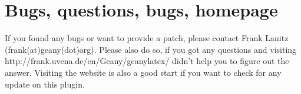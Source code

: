 \documentclass[/%
a4paper,%
10pt,%
oneside,%
DIV18,
headsepline,         %
plainheadsepline,
footsepline,         %
plainfootsepline,
bibtotoc,%
liststotoc,%
BCOR12mm,%
halfparskip,%
openany,%
]{scrartcl}
\begin{document}
\section{Bugs, questions, bugs, homepage}
\label{contact}
If you found any bugs or want to provide a patch, please contact Frank
Lanitz (frank(at)geany(dot)org). Please also do so, if you got any
questions and visiting http://frank.uvena.de/en/Geany/geanylatex/
didn't help you to figure out the answer. Visiting the website is also
a good start if you want to check for any update on this plugin.
\end{document}
